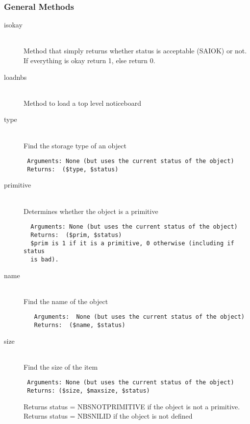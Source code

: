 \documentclass[twoside,11pt]{article}
\renewcommand{\_}{\texttt{\symbol{95}}}
\begin{document}
\subsubsection*{General Methods}%

\begin{description}

\item[isokay]%
%
\hfill\\
Method that simply returns whether status is acceptable (SAI\_{}\_{}OK)
or not. If everything is okay return 1, else return 0.

\item[loadnbs]%
%
\hfill\\
Method to load a top level noticeboard

\item[type]%
%
\hfill\\
Find the storage type of an object
\begin{verbatim}
 Arguments: None (but uses the current status of the object)
 Returns:  ($type, $status)
\end{verbatim}

\item[primitive]%
%
\hfill\\
Determines whether the object is a primitive
\begin{verbatim}
  Arguments: None (but uses the current status of the object)
  Returns:  ($prim, $status)
  $prim is 1 if it is a primitive, 0 otherwise (including if status
  is bad).
\end{verbatim}

\item[name]%
%
\hfill\\
Find the name of the object
\begin{verbatim}
   Arguments:  None (but uses the current status of the object)
   Returns:  ($name, $status)
\end{verbatim}

\item[size]%
%
\hfill\\
Find the size of the item
\begin{verbatim}
 Arguments: None (but uses the current status of the object)
 Returns: ($size, $maxsize, $status)
\end{verbatim}

Returns status = NBS\_{}\_{}NOTPRIMITIVE if the object is not a primitive.
Returns status = NBS\_{}\_{}NILID  if the object is not defined


\end{description}
\end{document}
